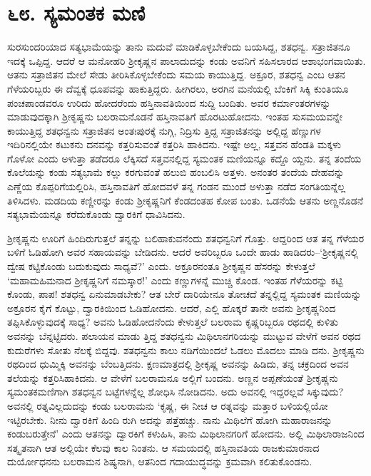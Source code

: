 
\chapter{೬೮. ಸ್ಯಮಂತಕ ಮಣಿ}

ಸುರಸುಂದರಿಯಾದ ಸತ್ಯಭಾಮೆಯನ್ನು ತಾನು ಮದುವೆ ಮಾಡಿಕೊಳ್ಳಬೇಕೆಂದು ಬಯಸಿದ್ದ, ಶತಧನ್ವ. ಸತ್ರಾಜಿತನೂ ಇದಕ್ಕೆ ಒಪ್ಪಿದ್ದ. ಆದರೆ ಆ ಮನೋಹರಿ ಶ್ರೀಕೃಷ್ಣನ ಪಾಲಾದುದನ್ನು ಕಂಡು ಅವನಿಗೆ ಸಹಿಸಲಾರದ ಆಶಾಭಂಗವಾಯಿತು. ಆತನು ಸತ್ರಾಜಿತನ ಮೇಲೆ ಸೇಡು ತೀರಿಸಿಕೊಳ್ಳಬೇಕೆಂದು ಸಮಯ ಕಾಯುತ್ತಿದ್ದ. ಅಕ್ರೂರ, ಶತಧನ್ವ ಎಂಬ ಆತನ ಗೆಳೆಯರಿಬ್ಬರು ಈ ದೆವ್ವಕ್ಕೆ ಧೂಪವನ್ನು ಹಾಕುತ್ತಿದ್ದರು. ಹೀಗಿರಲು, ಅರಗಿನ ಮನೆಯಲ್ಲಿ ಬೆಂಕಿಗೆ ಸಿಕ್ಕಿ ಕುಂತಿಯೂ ಪಂಚಪಾಂಡವರೂ ಉರಿದು ಹೋದರೆಂದು ಹಸ್ತಿನಾವತಿಯಿಂದ ಸುದ್ದಿ ಬಂದಿತು. ಅವರ ಕರ್ಮಾಂತರಗಳನ್ನು ಮಾಡುವುದಕ್ಕಾಗಿ ಶ್ರೀಕೃಷ್ಣನು ಬಲರಾಮನೊಡನೆ ಹಸ್ತಿನಾವತಿಗೆ ಹೊರಟುಹೋದನು. ಇಂತಹ ಸುಸಮಯವನ್ನೇ ಕಾಯುತ್ತಿದ್ದ ಶತಧನ್ವನು ಸತ್ರಾಜಿತನ ಅಂತಃಪುರಕ್ಕೆ ನುಗ್ಗಿ, ನಿದ್ರಿಸು ತ್ತಿದ್ದ ಸತ್ರಾಜಿತನನ್ನು ಅಲ್ಲಿದ್ದ ಹೆಣ್ಣುಗಳ ಇದಿರಿನಲ್ಲಿಯೇ ಕಟುಕನು ದನವನ್ನು ಕತ್ತರಿಸುವಂತೆ ಕತ್ತರಿಸಿ ಹಾಕಿದನು. ಇಷ್ಟೇ ಅಲ್ಲ, ಸತ್ತವನ ಹೆಂಡತಿ ಮಕ್ಕಳು ಗೊಳೋ ಎಂದು ಅಳುತ್ತಾ ತಡೆದರೂ ಲೆಕ್ಕಿಸದೆ ಸತ್ತವನಲ್ಲಿದ್ದ ಸ್ಯಮಂತಕ ಮಣಿಯನ್ನೂ ಕದ್ದೊ ಯ್ದನು. ತನ್ನ ತಂದೆಯ ಕೊಲೆಯನ್ನು ಕಂಡು ಸತ್ಯಭಾಮೆ ಕಲ್ಲು ಕರಗುವಂತೆ ಹಲುಬಿ ಹಂಬಲಿಸಿ ಅತ್ತಳು. ಅನಂತರ ತಂದೆಯ ದೇಹವನ್ನು ಎಣ್ಣೆಯ ಕೊಪ್ಪರಿಗೆಯಲ್ಲಿರಿಸಿ, ಹಸ್ತಿನಾವತಿಗೆ ಹೋದವಳೆ ತನ್ನ ಗಂಡನ ಮುಂದೆ ಅಳುತ್ತಾ ನಡೆದ ಸಂಗತಿಯನ್ನೆಲ್ಲ ತಿಳಿಸಿದಳು. ಮಡದಿಯ ಕಣ್ಣೀರನ್ನು ಕಂಡು ಶ್ರೀಕೃಷ್ಣನಿಗೆ ಕೆಂಡದಂತಹ ಕೋಪ ಬಂತು. ಒಡನೆಯೆ ಆತನು ಅಣ್ಣನೊಡನೆ ಸತ್ಯಭಾಮೆಯನ್ನೂ ಕರೆದುಕೊಂಡು ದ್ವಾರಕಿಗೆ ಧಾವಿಸಿದನು.

ಶ್ರೀಕೃಷ್ಣನು ಊರಿಗೆ ಹಿಂದಿರುಗುತ್ತಲೆ ತನ್ನನ್ನು ಬಲಿಹಾಕುವನೆಂದು ಶತಧನ್ವನಿಗೆ ಗೊತ್ತು. ಆದ್ದರಿಂದ ಆತ ತನ್ನ ಗೆಳೆಯರ ಬಳಿಗೆ ಓಡಿಹೋಗಿ ಅವರ ಸಹಾಯವನ್ನು ಬೇಡಿದನು. ಆದರೆ ಅವರಿಬ್ಬರೂ ಒಂದೇ ಹಾಡು ಹಾಡಿದರು–‘ಶ್ರೀಕೃಷ್ಣನಲ್ಲಿ ದ್ವೇಷ ಕಟ್ಟಿಕೊಂಡು ಬದುಕುವುದು ಸಾಧ್ಯವೆ?’ ಎಂದು. ಅಕ್ರೂರನಂತೂ ಶ್ರೀಕೃಷ್ಣನ ಹೆಸರನ್ನು ಕೇಳುತ್ತಲೆ ‘ಮಹಾಮಹಿಮನಾದ ಶ್ರೀಕೃಷ್ಣನಿಗೆ ನಮಸ್ಕಾರ!’ ಎಂದು ಕಣ್ಣುಗಳನ್ನೆ ಮುಚ್ಚಿ ಕೊಂಡ. ಇಂತಹ ಗೆಳೆಯರನ್ನು ಕಟ್ಟಿ ಕೊಂಡು, ಪಾಪ! ಶತಧನ್ವ ಏನುಮಾಡಬೇಕು? ಆತ ಬೇರೆ ದಾರಿಯೇನೂ ತೋಚದೆ ತನ್ನಲ್ಲಿದ್ದ ಸ್ಯಮಂತಕ ಮಣಿಯನ್ನು ಅಕ್ರೂರನ ಕೈಗೆ ಕೊಟ್ಟು, ದ್ವಾರಕಿಯಿಂದ ಓಡಿಹೋದನು. ಆದರೆ, ಎಲ್ಲಿ ಹೊಕ್ಕರೆ ತಾನೇ ಅವನು ಶ್ರೀಕೃಷ್ಣನಿಂದ ತಪ್ಪಿಸಿಕೊಳ್ಳುವುದಕ್ಕೆ ಸಾಧ್ಯ? ಅವನು ಓಡಿಹೋದನೆಂದು ಕೇಳುತ್ತಲೆ ಬಲರಾಮ ಕೃಷ್ಣರಿಬ್ಬರೂ ರಥದಲ್ಲಿ ಕುಳಿತು ಅವನನ್ನು ಬೆನ್ನಟ್ಟಿದರು. ಪಲಾಯನ ಮಾಡು ತ್ತಿದ್ದ ಶತಧನ್ವನು ಮಿಥಿಲಾನಗರಿಯನ್ನು ಮುಟ್ಟುವ ವೇಳೆಗೆ ಅವನ ರಥದ ಕುದುರೆಗಳು ಸೋತು ನೆಲಕ್ಕೆ ಬಿದ್ದವು. ಶತಧನ್ವನು ಕಾಲು ನಡಿಗೆಯಿಂದಲೆ ಓಡಲು ಮೊದಲು ಮಾಡಿ ದನು. ಶ್ರೀಕೃಷ್ಣನು ರಥದಿಂದ ಧುಮ್ಮಿಕ್ಕಿ ಅವನನ್ನು ಬೆಂಬತ್ತಿದನು. ಕ್ಷಣಮಾತ್ರದಲ್ಲಿ ಶ್ರೀಕೃಷ್ಣ ಅವನನ್ನು ಹಿಡಿದು, ತನ್ನ ಚಕ್ರದಿಂದ ಅವನ ತಲೆಯನ್ನು ಕತ್ತರಿಸಿಹಾಕಿದನು. ಆ ವೇಳೆಗೆ ಬಲರಾಮನೂ ಅಲ್ಲಿಗೆ ಬಂದನು. ಅಣ್ಣನ ಅಪ್ಪಣೆಯಂತೆ ಶ್ರೀಕೃಷ್ಣನು ಸ್ಯಮಂತಕಮಣಿಗಾಗಿ ಶತಧನ್ವನ ಬಟ್ಟೆಗಳನ್ನೆಲ್ಲ ಶೋಧಿಸಿ ನೋಡಿದನು. ಅದು ಅವನಲ್ಲಿ ಇದ್ದರಲ್ಲವೆ ಸಿಕ್ಕುವುದು? ಅವನಲ್ಲಿ ರತ್ನವಿಲ್ಲದುದನ್ನು ಕಂಡು ಬಲರಾಮನು ‘ಕೃಷ್ಣ, ಈ ನೀಚ ಆ ರತ್ನವನ್ನು ಮತ್ತಾರ ಬಳಿಯಲ್ಲಿಯೋ ಇಟ್ಟಿರಬೇಕು. ನೀನು ದ್ವಾರಕಿಗೆ ಹಿಂದಿ ರುಗಿ ಅದನ್ನು ಪತ್ತೆಹಚ್ಚು. ನಾನು ಮಿಥಿಲೆಗೆ ಹೋಗಿ ಮಹಾರಾಜನನ್ನು ಕಂಡುಬರುತ್ತೇನೆ’ ಎಂದು ಆತನನ್ನು ದ್ವಾರಕಿಗೆ ಕಳುಹಿಸಿ, ತಾನು ಮಿಥಿಲಾನಗರಿಗೆ ಹೋದನು. ಅಲ್ಲಿ ಮಿಥಿಲಾರಾಜನಿಂದ ಸತ್ಕೃತನಾಗಿ ಆತ ಅಲ್ಲಿಯೇ ಕೆಲವು ಕಾಲ ನಿಂತನು. ಆ ಸಮಯದಲ್ಲಿ ಹಸ್ತಿನಾವತಿಯ ರಾಜಕುಮಾರನಾದ ದುರ್ಯೋಧನನು ಬಲರಾಮನ ಶಿಷ್ಯನಾಗಿ, ಆತನಿಂದ ಗದಾಯುದ್ಧವನ್ನು ಕ್ರಮವಾಗಿ ಕಲಿತುಕೊಂಡನು.

